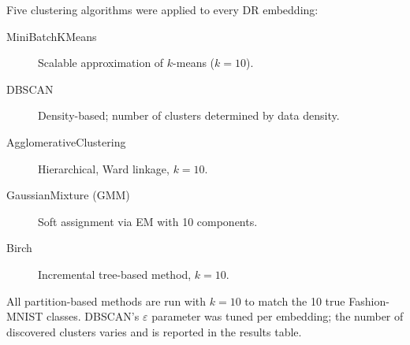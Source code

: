 Five clustering algorithms were applied to every DR embedding:

\begin{description}
  \item[MiniBatchKMeans] Scalable approximation of $k$-means ($k=10$).
  \item[DBSCAN] Density-based; number of clusters determined by data density.
  \item[AgglomerativeClustering] Hierarchical, Ward linkage, $k=10$.
  \item[GaussianMixture (GMM)] Soft assignment via EM with 10 components.
  \item[Birch] Incremental tree-based method, $k=10$.
\end{description}

All partition-based methods are run with $k=10$ to match the 10 true Fashion-MNIST classes.
DBSCAN's $\varepsilon$ parameter was tuned per embedding; the number of discovered clusters
varies and is reported in the results table.
